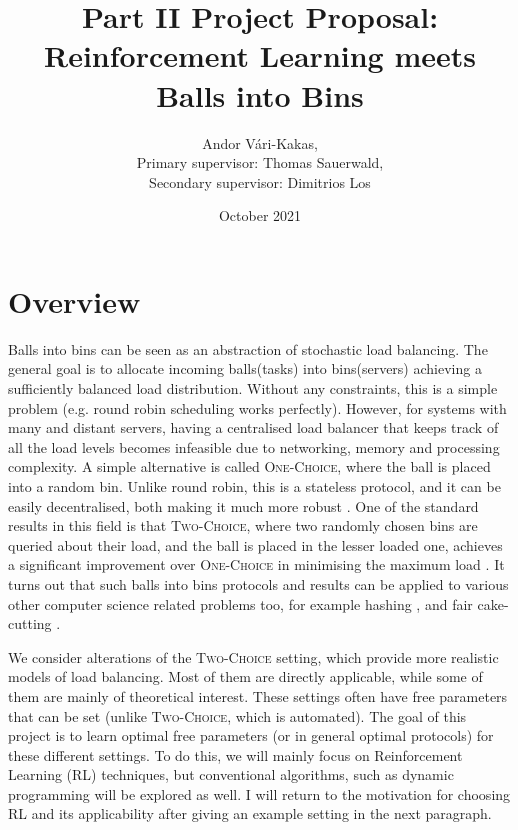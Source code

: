 \documentclass[11pt,a4paper]{article}
\title{Part II Project Proposal: Reinforcement Learning meets Balls into Bins
}
\date{October 2021}
\author{Andor Vári-Kakas, 

Primary supervisor: Thomas Sauerwald,

Secondary supervisor: Dimitrios Los}
\begin{document}
\maketitle


\section{Overview}

Balls into bins can be seen as an abstraction of stochastic load balancing. The general goal is to allocate incoming balls(tasks) into bins(servers) achieving a sufficiently balanced load distribution. Without any constraints, this is a simple problem (e.g. round robin scheduling works  perfectly). However, for systems with many and distant servers, having a centralised load balancer that keeps track of all the load levels becomes infeasible due to networking, memory and processing complexity.  A simple alternative is called \textsc{One-Choice}, where the ball is placed into a random bin. Unlike round robin, this is a stateless protocol, and it can be easily decentralised, both making it much more robust \cite{nasir2015power}. One of the standard results in this field is that \textsc{Two-Choice}, where two randomly chosen bins are queried about their load, and the ball is placed in the lesser loaded one, achieves a significant improvement over \textsc{One-Choice} in minimising the maximum load \cite{azar1994balanced}. It turns out that such balls into bins protocols and results can be applied to various other computer science related problems too, for example hashing \cite{dahlgaard2016power}, and fair cake-cutting \cite{edmonds2006balanced}.

We consider alterations of the \textsc{Two-Choice} setting, which provide more realistic models of load balancing. Most of them are directly applicable, while some of them are mainly of theoretical interest. These settings often have free parameters that can be set (unlike \textsc{Two-Choice}, which is automated). The goal of this project is to learn optimal free parameters (or in general optimal protocols) for these different settings. To do this, we will mainly focus on Reinforcement Learning (RL) techniques, but conventional algorithms, such as dynamic programming will be explored as well. I will return to the motivation for choosing RL and its applicability after giving an example setting in the next paragraph.
\end{document}
